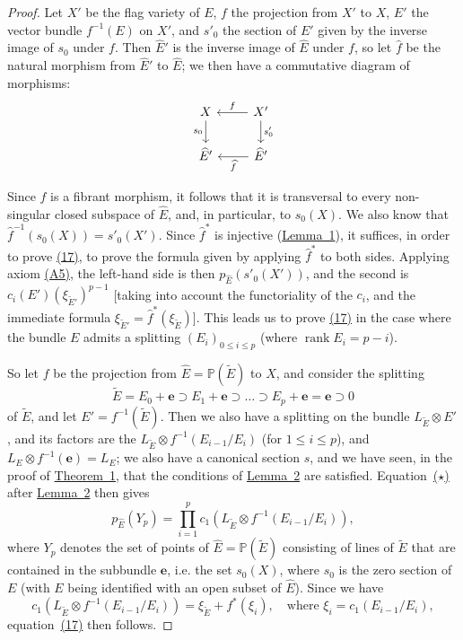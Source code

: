 \documentclass{article}
\renewcommand{\leq}{\leqslant}
\DeclareMathOperator{\rank}{rank}
\newcommand{\oldpage}[1]{\marginpar{\footnotesize$\Big\vert$ \textit{p.~#1}}}
\begin{document}
\begin{proof}
  Let $X'$ be the flag variety of $E$, $f$ the projection from $X'$ to $X$, $E'$ the vector bundle $f^{-1}(E)$ on $X'$, and $s'_0$ the section of $E'$ given by the inverse image of $s_0$ under $f$.
  Then $\widehat{E}'$ is the inverse image of $\widehat{E}$ under $f$, so let $\widehat{f}$ be the natural morphism from $\widehat{E}'$ to $\widehat{E}$;
  we then have a commutative diagram of morphisms:
  \[
    \begin{tikzcd}
      X \dar[swap,"s_0"]
      & X' \lar[swap,"f"] \dar["s'_0"]
    \\\widehat{E}'
      & \widehat{E}' \lar["\widehat{f}"]
    \end{tikzcd}
  \]

  Since $\widehat{f}$ is a fibrant morphism, it follows that it is transversal to every non-singular closed subspace of $\widehat{E}$, and, in particular, to $s_0(X)$.
  We also know that $\widehat{f}^{-1}(s_0(X)) = s'_0(X')$.
  Since $\widehat{f}^*$ is injective (\hyperref[lemma1]{Lemma~1}), it suffices, in order to prove \hyperref[equation17]{(17)}, to prove the formula given by applying $\widehat{f}^*$ to both sides.
  Applying axiom \hyperref[axiomA5]{(A5)}, the left-hand side is then $p_{\widehat{E}}(s'_0(X'))$, and the second is $c_i(E')(\xi_{\widetilde{E}'})^{p-1}$ [taking into account the functoriality of the $c_i$, and the immediate formula $\xi_{\widetilde{E}'}=\widehat{f}^*(\xi_{\widetilde{E}})$].
  This leads us to prove \hyperref[equation17]{(17)} in the case where the bundle $E$ admits a splitting $(E_i)_{0\leq i\leq p}$ (where $\rank E_i=p-i$).

  So let $f$ be the projection from $\widehat{E}=\mathbb{P}(\widetilde{E})$ to $X$, and consider the splitting
  \[
    \widetilde{E} = E_0+\mathbf{e} \supset E_1+\mathbf{e} \supset \ldots \supset E_p+\mathbf{e} = \mathbf{e} \supset 0
  \]
  of $\widetilde{E}$, and let $E'=f^{-1}(\widetilde{E})$.
  Then we also have a splitting on the bundle $L_{\widetilde{E}}\otimes E'$, and its factors are the $L_{\widetilde{E}}\otimes f^{-1}(E_{i-1}/E_i)$ (for $1\leq i\leq p$), and $L_E\otimes f^{-1}(\mathbf{e}) = L_E$;
  we also have a canonical section $s$, and we have seen, in the proof of \hyperref[theorem1]{Theorem~1}, that the conditions of \hyperref[lemma2]{Lemma~2} are satisfied.
  Equation~\hyperref[lemma2equationstar]{($\star$)}
\oldpage{153}
  after \hyperref[lemma2]{Lemma~2} then gives
  \[
    p_{\widehat{E}}(Y_p) = \prod_{i=1}^p c_1(L_{\widetilde{E}}\otimes f^{-1}(E_{i-1}/E_i)),
  \]
  where $Y_p$ denotes the set of points of $\widehat{E}=\mathbb{P}(\widetilde{E})$ consisting of lines of $\widetilde{E}$ that are contained in the subbundle $\mathbf{e}$, i.e. the set $s_0(X)$, where $s_0$ is the zero section of $E$ (with $E$ being identified with an open subset of $\widehat{E}$).
  Since we have
  \[
    c_1(L_{\widetilde{E}}\otimes f^{-1}(E_{i-1}/E_i)) = \xi_{\widetilde{E}}+f^*(\xi_i),
    \quad\text{where }\xi_i = c_1(E_{i-1}/E_i),
  \]
  equation~\hyperref[equation17]{(17)} then follows.
\end{proof}
\end{document}
